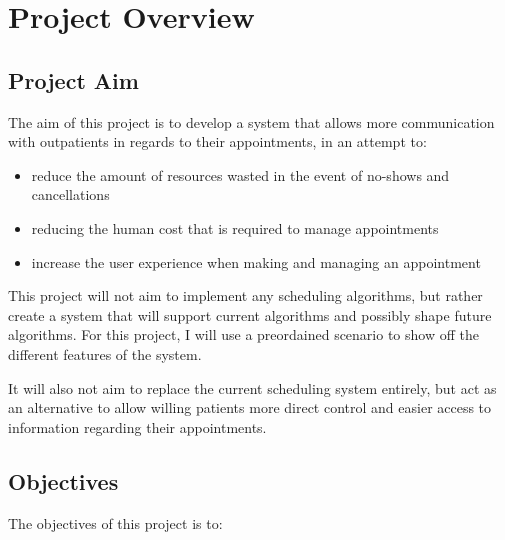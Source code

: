 
\chapter{Project Overview} %

\label{Chapter1} %



\section{Project Aim}

The aim of this project is to develop a system that allows more communication with outpatients in regards to their appointments, in an attempt to: 

\begin{itemize}
  \item reduce the amount of resources wasted in the event of no-shows and cancellations
  \item reducing the human cost that is required to manage appointments
  \item increase the user experience when making and managing an appointment
\end{itemize}

This project will not aim to implement any scheduling algorithms, but rather create a system that will support current algorithms and possibly shape future algorithms. For this project, I will use a preordained scenario to show off the different features of the system.

It will also not aim to replace the current scheduling system entirely, but act as an alternative to allow willing patients more direct control and easier access to information regarding their appointments. 


\section{Objectives}

The objectives of this project is to:

